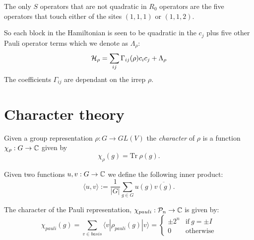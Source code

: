 \documentclass[12pt,notitlepage,longbibliography,nofootinbib,tightenlines]{revtex4}
\begin{document}
The only $S$ operators that are not 
quadratic in $R_0$ operators are the five
operators that touch either of the sites
$(1,1,1)$ or $(1,1,2)$.

So each block in the Hamiltonian
is seen to be quadratic in the $c_j$ plus
five other Pauli operator terms which we denote as $\Lambda_\rho$:
$$
    \mathcal{H}_\rho = \sum_{ij} \Gamma_{ij}(\rho) c_i c_j + \Lambda_\rho
$$
The coefficients $\Gamma_{ij}$ are dependant on the irrep $\rho.$


%
%

%


%
%

\appendix
\section{Character theory}
\label{appendix}

Given a group representation $\rho:G\to GL(V)$
the {\it character} of $\rho$ is a function
$\chi_\rho:G\to \mathbb{C}$ given by
$$
    \chi_\rho(g) = \mbox{Tr}\ \rho(g).
$$

Given two functions $u,v : G \to \mathbb{C}$ 
we define the following inner product:
$$
    \langle u, v \rangle := \frac{1}{|G|} \sum_{g\in G} u(g) \overline{v(g)}.
$$

The character of the Pauli representation, $\chi_{{pauli}}:\mathcal{P}_n\to\mathbb{C}$
is given by:
$$
\chi_{{pauli}}(g) = \sum_{v \in basis} \langle v | \rho_{{pauli}}(g) | v \rangle
    = \left\{ \begin{array}{ll}
 \pm 2^n &\mbox{if}\ g=\pm I\\
 0 &\mbox{otherwise}\end{array}\right.
$$
\end{document}

